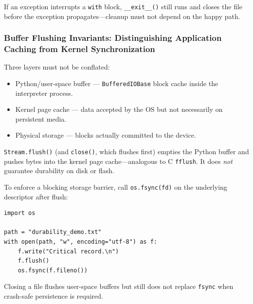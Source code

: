 If an exception interrupts a \texttt{with} block, \texttt{\_\_exit\_\_()} still runs and closes the file before the exception propagates---cleanup must not depend on the happy path.

\subsubsection{Buffer Flushing Invariants: Distinguishing Application Caching from Kernel Synchronization}

Three layers must not be conflated:

\begin{itemize}
    \item Python/user-space buffer --- \texttt{BufferedIOBase} block cache inside the interpreter process.
    \item Kernel page cache --- data accepted by the OS but not necessarily on persistent media.
    \item Physical storage --- blocks actually committed to the device.
\end{itemize}

\texttt{Stream.flush()} (and \texttt{close()}, which flushes first) empties the Python buffer and pushes bytes into the kernel page cache---analogous to C \texttt{fflush}. It does \emph{not} guarantee durability on disk or flash.

To enforce a blocking storage barrier, call \texttt{os.fsync(fd)} on the underlying descriptor after flush:

\begin{verbatim}
import os

path = "durability_demo.txt"
with open(path, "w", encoding="utf-8") as f:
    f.write("Critical record.\n")
    f.flush()
    os.fsync(f.fileno())
\end{verbatim}

Closing a file flushes user-space buffers but still does not replace \texttt{fsync} when crash-safe persistence is required.
